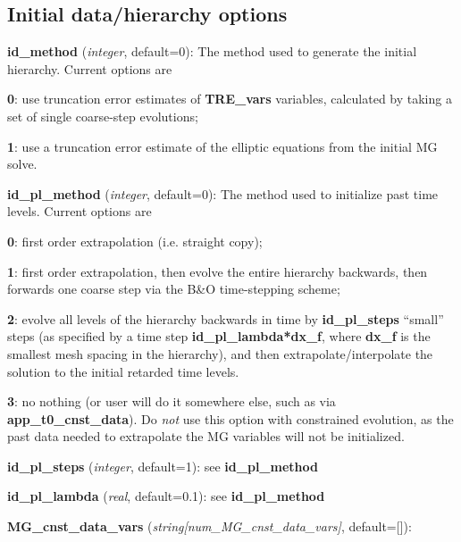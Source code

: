 \documentclass[aps,amssymb,unsortedaddress,nofootinbib]{revtex4}
\def\lsep{\itemsep 0.05in}
\begin{document}
\subsection{Initial data/hierarchy options}

\begin{list}{}{\lsep}
\item {\bf id\_method} ({\em integer}, default=0):
      The method used to generate the initial hierarchy. Current options
      are 
      \begin{list}{}{\lsep}
      \item {\bf 0}: use truncation error estimates of {\bf TRE\_vars} variables,
            calculated by taking a set of single coarse-step evolutions;
      \item {\bf 1}: use a truncation error estimate of the elliptic
            equations from the initial MG solve.
      \end{list}
\item {\bf id\_pl\_method} ({\em integer}, default=0):
      The method used to initialize past time levels. Current options
      are 
      \begin{list}{}{\lsep}
      \item {\bf 0}: first order extrapolation (i.e. straight copy);
      \item {\bf 1}: first order extrapolation, then evolve the entire hierarchy
            backwards, then forwards one coarse step via the B\&O time-stepping
            scheme;
      \item {\bf 2}: evolve all levels of the hierarchy backwards in time 
             by {\bf id\_pl\_steps} ``small'' steps (as specified by a time step
            {\bf id\_pl\_lambda*dx\_f}, where {\bf dx\_f} is the smallest mesh spacing
            in the hierarchy), and then extrapolate/interpolate the solution to the initial
            retarded time levels.
      \item {\bf 3}: no nothing (or user will do it somewhere else, such
            as via {\bf app\_t0\_cnst\_data}).
            Do {\em not} use this option with constrained evolution, as the past
            data needed to extrapolate the MG variables will not be initialized.
      \end{list}
\item {\bf id\_pl\_steps} ({\em integer}, default=1): see {\bf id\_pl\_method}
\item {\bf id\_pl\_lambda} ({\em real}, default=0.1): see {\bf id\_pl\_method}
\item {\bf MG\_cnst\_data\_vars} ({\em string[num\_MG\_cnst\_data\_vars]}, default=[]):

\end{list}
\end{document}
